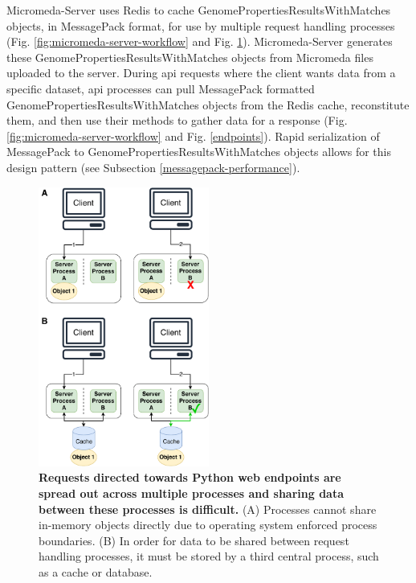 Micromeda-Server uses Redis to cache GenomePropertiesResultsWithMatches objects, 
in MessagePack format, for use by multiple request handling processes (Fig. 
\ref{fig:micromeda-server-workflow} and Fig. \ref{fig:client-processing}). 
Micromeda-Server generates these GenomePropertiesResultsWithMatches objects from 
Micromeda files uploaded to the server. During \gls{api} requests where the 
client wants data from a specific dataset, \gls{api} processes can pull 
MessagePack formatted GenomePropertiesResultsWithMatches objects from the Redis 
cache, reconstitute them, and then use their methods to gather data for a 
response (Fig. \ref{fig:micromeda-server-workflow} and Fig. \ref{endpoints}). 
Rapid serialization of MessagePack to GenomePropertiesResultsWithMatches objects 
allows for this design pattern (see Subsection \ref{messagepack-performance}).

\begin{figure}[!ht]
  \centering
	\includegraphics[width=0.50\textwidth]{media/Client-Processing.pdf}
	 \caption[Requests directed towards Python web endpoints are spread out across 
multiple processes and sharing data between these processes is 
difficult.]{\textbf{Requests directed towards Python web endpoints are spread 
out across multiple processes and sharing data between these processes is 
difficult.} (A) Processes cannot share in-memory objects directly due to 
operating system enforced process boundaries. (B) In order for data to be shared 
between request handling processes, it must be stored by a third central 
process, such as a cache or database.}
	 \label{fig:client-processing}
\end{figure}

